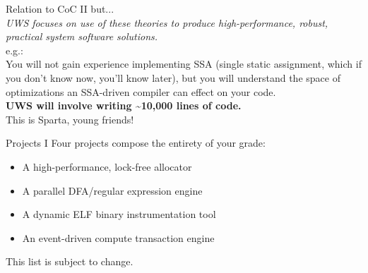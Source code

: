 \documentclass{beamer}
\begin{document}
\begin{frame}{Relation to CoC II}
but... \\
\emph{UWS focuses on {\it use} of these theories to produce high-performance,
robust, {\it practical} system software solutions.}\linebreak \\
e.g.: \\
You will not gain experience implementing SSA (single static
assignment, which if you don't know now, you'll know later), but you will
understand the space of optimizations an SSA-driven compiler can effect on your
code.\linebreak \\
{\bf UWS will involve writing \~{}10,000 lines of code.}\linebreak \\
This is Sparta, young friends!
\end{frame}

\begin{frame}[t]{Projects I}
Four projects compose the entirety of your grade:
\vspace{.25in}
\begin{itemize}
\item A high-performance, lock-free allocator
\item A parallel DFA/regular expression engine
\item A dynamic ELF binary instrumentation tool
\item An event-driven compute transaction engine
\end{itemize}
\vspace{.25in}
This list is subject to change.\\
\end{frame}
\end{document}
